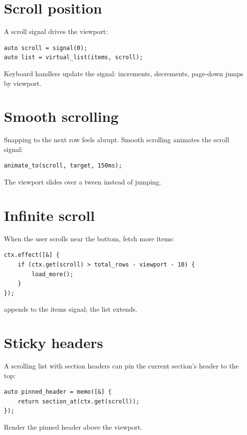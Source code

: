 \section{Scroll position}

A scroll signal drives the viewport:

\begin{lstlisting}
auto scroll = signal(0);
auto list = virtual_list(items, scroll);
\end{lstlisting}

Keyboard handlers update the signal:  increments,
 decrements, page-down jumps by viewport.

\section{Smooth scrolling}

Snapping to the next row feels abrupt. Smooth scrolling
animates the scroll signal:

\begin{lstlisting}
animate_to(scroll, target, 150ms);
\end{lstlisting}

The viewport slides over a tween instead of jumping.

\section{Infinite scroll}

When the user scrolls near the bottom, fetch more items:

\begin{lstlisting}
ctx.effect([&] {
    if (ctx.get(scroll) > total_rows - viewport - 10) {
        load_more();
    }
});
\end{lstlisting}

 appends to the items signal; the list
extends.

\section{Sticky headers}

A scrolling list with section headers can pin the current
section's header to the top:

\begin{lstlisting}
auto pinned_header = memo([&] {
    return section_at(ctx.get(scroll));
});
\end{lstlisting}

Render the pinned header above the viewport.

